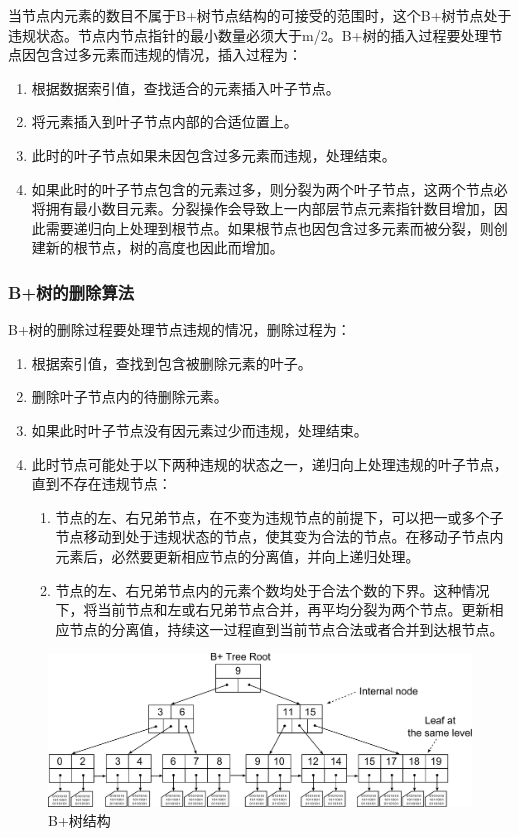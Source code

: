 当节点内元素的数目不属于B+树节点结构的可接受的范围时，这个B+树节点处于违规状态。节点内节点指针的最小数量必须大于m/2。B+树的插入过程要处理节点因包含过多元素而违规的情况，插入过程为：
\begin{enumerate}
\item 根据数据索引值，查找适合的元素插入叶子节点。
\item 将元素插入到叶子节点内部的合适位置上。
\item 此时的叶子节点如果未因包含过多元素而违规，处理结束。
\item 如果此时的叶子节点包含的元素过多，则分裂为两个叶子节点，这两个节点必将拥有最小数目元素。分裂操作会导致上一内部层节点元素指针数目增加，因此需要递归向上处理到根节点。如果根节点也因包含过多元素而被分裂，则创建新的根节点，树的高度也因此而增加。
\end{enumerate}

\subsubsection{B+树的删除算法}

B+树的删除过程要处理节点违规的情况，删除过程为：

\begin{enumerate}
\item 根据索引值，查找到包含被删除元素的叶子。
\item 删除叶子节点内的待删除元素。
\item 如果此时叶子节点没有因元素过少而违规，处理结束。
\item 此时节点可能处于以下两种违规的状态之一，递归向上处理违规的叶子节点，直到不存在违规节点：
\begin{enumerate}
\item 节点的左、右兄弟节点，在不变为违规节点的前提下，可以把一或多个子节点移动到处于违规状态的节点，使其变为合法的节点。在移动子节点内元素后，必然要更新相应节点的分离值，并向上递归处理。
\item 节点的左、右兄弟节点内的元素个数均处于合法个数的下界。这种情况下，将当前节点和左或右兄弟节点合并，再平均分裂为两个节点。更新相应节点的分离值，持续这一过程直到当前节点合法或者合并到达根节点。
\end{enumerate}
\end{enumerate}

\begin{figure}[!htb]
\centering
\includegraphics[width=1\linewidth]{./graph/bplus-tree}
\caption{B+树结构}
\label{fig:bplus-tree}
\end{figure}

